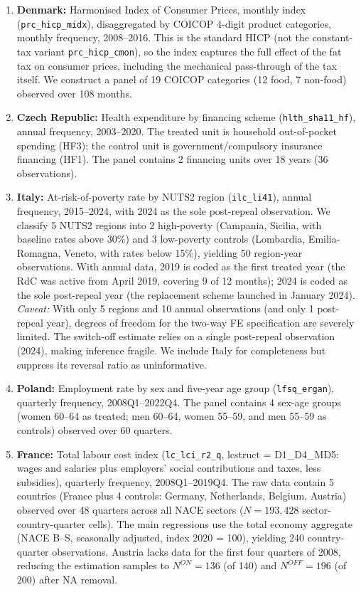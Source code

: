 \documentclass[12pt]{article}
\begin{document}
\begin{enumerate}
    \item \textbf{Denmark:} Harmonised Index of Consumer Prices, monthly index (\texttt{prc\_hicp\_midx}), disaggregated by COICOP 4-digit product categories, monthly frequency, 2008--2016. This is the standard HICP (not the constant-tax variant \texttt{prc\_hicp\_cmon}), so the index captures the full effect of the fat tax on consumer prices, including the mechanical pass-through of the tax itself. We construct a panel of 19 COICOP categories (12 food, 7 non-food) observed over 108 months.

    \item \textbf{Czech Republic:} Health expenditure by financing scheme (\texttt{hlth\_sha11\_hf}), annual frequency, 2003--2020. The treated unit is household out-of-pocket spending (HF3); the control unit is government/compulsory insurance financing (HF1). The panel contains 2 financing units over 18 years (36 observations).

    \item \textbf{Italy:} At-risk-of-poverty rate by NUTS2 region (\texttt{ilc\_li41}), annual frequency, 2015--2024, with 2024 as the sole post-repeal observation. We classify 5 NUTS2 regions into 2 high-poverty (Campania, Sicilia, with baseline rates above 30\%) and 3 low-poverty controls (Lombardia, Emilia-Romagna, Veneto, with rates below 15\%), yielding 50 region-year observations. With annual data, 2019 is coded as the first treated year (the RdC was active from April 2019, covering 9 of 12 months); 2024 is coded as the sole post-repeal year (the replacement scheme launched in January 2024). \textit{Caveat:} With only 5 regions and 10 annual observations (and only 1 post-repeal year), degrees of freedom for the two-way FE specification are severely limited. The switch-off estimate relies on a single post-repeal observation (2024), making inference fragile. We include Italy for completeness but suppress its reversal ratio as uninformative.

    \item \textbf{Poland:} Employment rate by sex and five-year age group (\texttt{lfsq\_ergan}), quarterly frequency, 2008Q1--2022Q4. The panel contains 4 sex-age groups (women 60--64 as treated; men 60--64, women 55--59, and men 55--59 as controls) observed over 60 quarters.

    \item \textbf{France:} Total labour cost index (\texttt{lc\_lci\_r2\_q}, lcstruct = D1\_D4\_MD5: wages and salaries plus employers' social contributions and taxes, less subsidies), quarterly frequency, 2008Q1--2019Q4. The raw data contain 5 countries (France plus 4 controls: Germany, Netherlands, Belgium, Austria) observed over 48 quarters across all NACE sectors ($N = 193{,}428$ sector-country-quarter cells). The main regressions use the total economy aggregate (NACE B--S, seasonally adjusted, index 2020 = 100), yielding 240 country-quarter observations. Austria lacks data for the first four quarters of 2008, reducing the estimation samples to $N^{ON} = 136$ (of 140) and $N^{OFF} = 196$ (of 200) after NA removal.
\end{enumerate}
\end{document}
